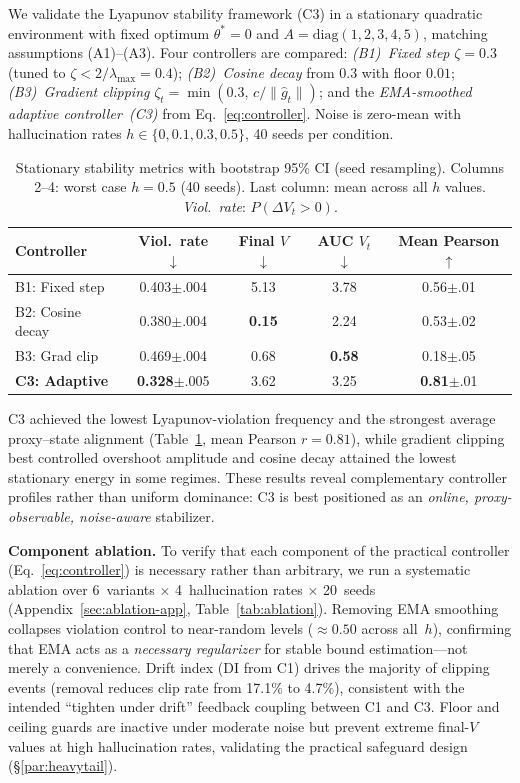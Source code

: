 \documentclass{article}
\begin{document}
We validate the Lyapunov stability framework (C3) in a stationary
quadratic environment with fixed optimum $\theta^*{=}0$ and
$A{=}\mathrm{diag}(1,2,3,4,5)$, matching assumptions (A1)--(A3).
Four controllers are compared:
\emph{(B1)~Fixed step} $\zeta{=}0.3$ (tuned to $\zeta < 2/\lambda_{\max}{=}0.4$);
\emph{(B2)~Cosine decay} from $0.3$ with floor $0.01$;
\emph{(B3)~Gradient clipping} $\zeta_t{=}\min(0.3,\,c/\|\hat{g}_t\|)$;
and the \emph{EMA-smoothed adaptive controller~(C3)} from
Eq.~\eqref{eq:controller}.
Noise is zero-mean with hallucination rates $h \in \{0, 0.1, 0.3, 0.5\}$,
40 seeds per condition.

\begin{table}[t]
\centering
\caption{Stationary stability metrics with bootstrap 95\% CI
  (seed resampling). Columns 2--4: worst case $h{=}0.5$
  (40 seeds). Last column: mean across all $h$ values.
  \emph{Viol.\ rate}: $P(\Delta V_t > 0)$.}
\label{tab:e3a}
\small
\begin{tabular}{@{}lcccc@{}}
\toprule
\textbf{Controller} & \textbf{Viol.\ rate} $\downarrow$
  & \textbf{Final $V$} $\downarrow$
  & \textbf{AUC $V_t$} $\downarrow$
  & \textbf{Mean Pearson} $\uparrow$ \\
\midrule
B1: Fixed step   & 0.403{\tiny$\pm$.004} & 5.13 & 3.78 & 0.56{\tiny$\pm$.01} \\
B2: Cosine decay & 0.380{\tiny$\pm$.004} & \textbf{0.15} & 2.24 & 0.53{\tiny$\pm$.02} \\
B3: Grad clip    & 0.469{\tiny$\pm$.004} & 0.68 & \textbf{0.58} & 0.18{\tiny$\pm$.05} \\
\textbf{C3: Adaptive} & \textbf{0.328}{\tiny$\pm$.005} & 3.62 & 3.25 & \textbf{0.81}{\tiny$\pm$.01} \\
\bottomrule
\end{tabular}
\end{table}

C3 achieved the lowest Lyapunov-violation frequency and the strongest
average proxy--state alignment (Table~\ref{tab:e3a}, mean Pearson
$r{=}0.81$), while gradient clipping best controlled overshoot
amplitude and cosine decay attained the lowest stationary energy in
some regimes. These results reveal complementary controller profiles
rather than uniform dominance: C3 is best positioned as an
\emph{online, proxy-observable, noise-aware} stabilizer.

\textbf{Component ablation.}
To verify that each component of the practical controller
(Eq.~\ref{eq:controller}) is necessary rather than arbitrary,
we run a systematic ablation over 6~variants $\times$ 4~hallucination
rates $\times$ 20~seeds (Appendix~\ref{sec:ablation-app},
Table~\ref{tab:ablation}).
Removing EMA smoothing collapses violation control to near-random
levels ($\approx 0.50$ across all~$h$), confirming that EMA acts as
a \emph{necessary regularizer} for stable bound estimation---not
merely a convenience.
Drift index (DI from C1) drives the majority of clipping events
(removal reduces clip rate from 17.1\% to 4.7\%), consistent with
the intended ``tighten under drift'' feedback coupling between
C1 and C3.
Floor and ceiling guards are inactive under moderate noise but
prevent extreme final-$V$ values at high hallucination rates,
validating the practical safeguard design (\S\ref{par:heavytail}).
\end{document}
